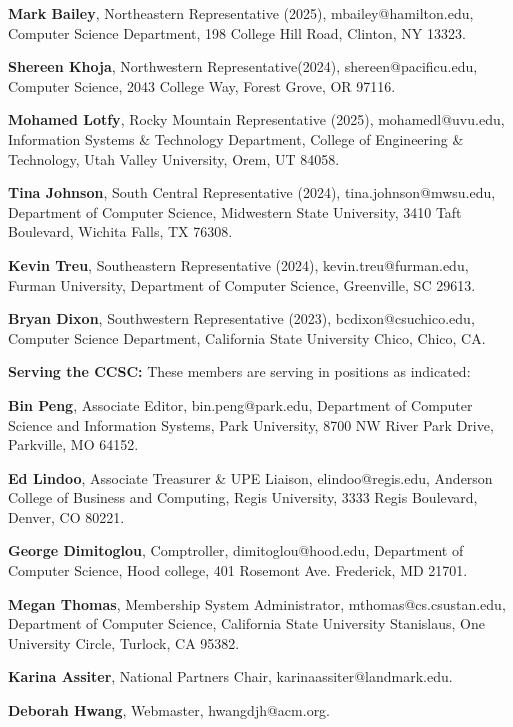 \documentclass{article}
\begin{document}
\begin{multicols}{2}
\begin{raggedright}
{\noindent
\textbf{Mark Bailey}, Northeastern Representative (2025), mbailey@hamilton.edu, Computer Science Department, 198 College Hill Road, Clinton, NY 13323.

\noindent
\textbf{Shereen Khoja},	Northwestern Representative(2024), shereen@pacificu.edu,
Computer Science, 2043 College Way, Forest Grove, OR 97116.

\noindent
\textbf{Mohamed Lotfy}, Rocky Mountain Representative (2025),
mohamedl@uvu.edu, Information Systems \& Technology Department,
College of Engineering \& Technology, Utah Valley University, Orem, UT 84058.

\noindent
\textbf{Tina Johnson}, South Central Representative (2024),
tina.johnson@mwsu.edu, Department of Computer Science, Midwestern State University,
3410 Taft Boulevard, Wichita Falls, TX 76308.

\noindent
\textbf{Kevin Treu}, Southeastern Representative (2024),
kevin.treu@furman.edu, Furman University, Department of Computer Science, Greenville,
SC 29613.

\noindent
\textbf{Bryan Dixon}, Southwestern Representative (2023),
bcdixon@csuchico.edu, Computer Science Department, California State University Chico, Chico, CA.


\vspace{0.2in}
\noindent
\textbf{Serving the CCSC:} These members are serving in positions as indicated:

\noindent
\textbf{Bin Peng}, Associate Editor,
bin.peng@park.edu, Department of Computer Science and
Information Systems, Park University, 8700 NW River Park Drive, Parkville, MO 64152.

\noindent
\textbf{Ed Lindoo}, Associate Treasurer \& UPE Liaison, elindoo@regis.edu,
Anderson College of Business and Computing, Regis University, 3333 Regis Boulevard, Denver, CO 80221.

\noindent
\textbf{George Dimitoglou}, Comptroller,
dimitoglou@hood.edu,
Department of Computer Science, Hood college,
401 Rosemont Ave. Frederick, MD 21701.

\noindent
\textbf{Megan Thomas}, Membership System Administrator,
mthomas@cs.csustan.edu, Department of Computer Science, California State University Stanislaus,
One University Circle, Turlock, CA 95382.

\noindent
\textbf{Karina Assiter}, National Partners Chair, karinaassiter@landmark.edu.

\noindent
\textbf{Deborah Hwang}, Webmaster, hwangdjh@acm.org.

} %

\end{raggedright}
\end{multicols}
\end{document}
